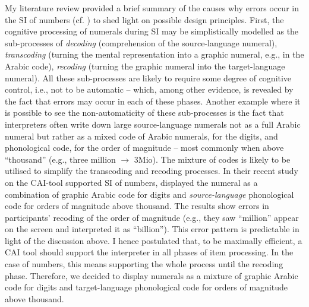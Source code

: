 My literature review provided a brief summary of the causes why errors occur in the SI of numbers (cf. \cite{frittella2017numeri,frittella2019a}) to shed light on possible design principles. First, the cognitive processing of numerals during SI may be simplistically modelled as the sub-processes of \textit{decoding} (comprehension of the source-language numeral), \textit{transcoding} (turning the mental representation into a graphic numeral, e.g., in the Arabic code), \textit{recoding} (turning the graphic numeral into the target-language numeral). All these sub-processes are likely to require some degree of cognitive control, i.e., not to be automatic -- which, among other evidence, is revealed by the fact that errors may occur in each of these phases. Another example where it is possible to see the non-automaticity of these sub-processes is the fact that interpreters often write down large source-language numerals not as a full Arabic numeral but rather as a mixed code of Arabic numerals, for the digits, and phonological code, for the order of magnitude -- most commonly when above “thousand” (e.g., three million $\longrightarrow$ 3Mio). The mixture of codes is likely to be utilised to simplify the transcoding and recoding processes. In their recent study on the CAI-tool supported SI of numbers, \citet{pisani2021measuring} displayed the numeral as a combination of graphic Arabic code for digits and \textit{source-language} phonological code for orders of magnitude above thousand. The results show errors in participants’ recoding of the order of magnitude (e.g., they saw “million” appear on the screen and interpreted it as “billion”). This error pattern is predictable in light of the discussion above. I hence postulated that, to be maximally efficient, a CAI tool should support the interpreter in all phases of item processing. In the case of numbers, this means supporting the whole process until the recoding phase. Therefore, we decided to display numerals as a mixture of graphic Arabic code for digits and target-language phonological code for orders of magnitude above thousand.

